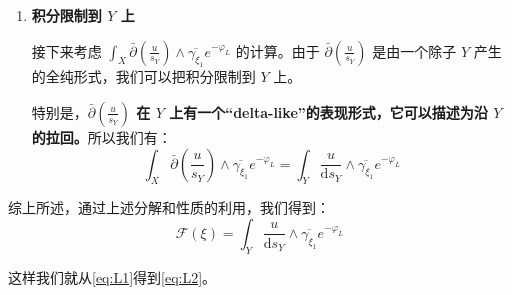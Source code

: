 \begin{solution}
\begin{enumerate}
\item  \textbf{积分限制到 $Y$ 上}

接下来考虑 $\int_X \bar{\partial}\left(\frac{u}{s_Y}\right) \wedge \overline{\gamma_{\xi_1}} e^{-\varphi_L}$ 的计算。由于 $\bar{\partial}\left(\frac{u}{s_Y}\right)$ 是由一个除子 $Y$ 产生的全纯形式，我们可以把积分限制到 $Y$ 上。

特别是，\textbf{$\bar{\partial}\left(\frac{u}{s_Y}\right)$ 在 $Y$ 上有一个“delta-like”的表现形式，它可以描述为沿 $Y$ 的拉回。}所以我们有：
$$
\int_X \bar{\partial}\left(\frac{u}{s_Y}\right) \wedge \overline{\gamma_{\xi_1}} e^{-\varphi_L} = \int_Y \frac{u}{\mathrm{d} s_Y} \wedge \overline{\gamma_{\xi_1}} e^{-\varphi_L}
$$
\end{enumerate}
综上所述，通过上述分解和性质的利用，我们得到：
$$
\mathcal{F}(\xi) = \int_Y \frac{u}{\mathrm{d} s_Y} \wedge \overline{\gamma_{\xi_1}} e^{-\varphi_L}
$$

这样我们就从\eqref{eq:L1}得到\eqref{eq:L2}。
\end{solution}

